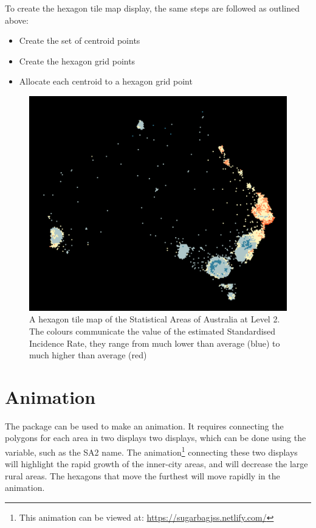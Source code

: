 \documentclass[
]{jss}
\providecommand{\tightlist}{%
  \setlength{\itemsep}{0pt}\setlength{\parskip}{0pt}}
\begin{document}
To create the hexagon tile map display, the same steps are followed as
outlined above:

\begin{itemize}
\tightlist
\item
  Create the set of centroid points
\item
  Create the hexagon grid points
\item
  Allocate each centroid to a hexagon grid point
\end{itemize}

\begin{figure}

{\centering \includegraphics[width=0.6\linewidth]{figures/aus_melanoma_p_hex} 

}

\caption[A hexagon tile map of the Statistical Areas of Australia at Level 2]{A hexagon tile map of the Statistical Areas of Australia at Level 2. The colours communicate the value of the estimated Standardised Incidence Rate, they range from much lower than average (blue) to much higher than average (red)}\label{fig:melanoma-hex}
\end{figure}

\hypertarget{animation}{%
\section{Animation}\label{animation}}

The  package can be used to make an animation. It
requires connecting the polygons for each area in two displays two
displays, which can be done using the  variable, such as the
SA2 name. The animation\footnote{This animation can be viewed at:
  \url{https://sugarbagjss.netlify.com/}} connecting these two displays
will highlight the rapid growth of the inner-city areas, and will
decrease the large rural areas. The hexagons that move the furthest will
move rapidly in the animation.
\end{document}
